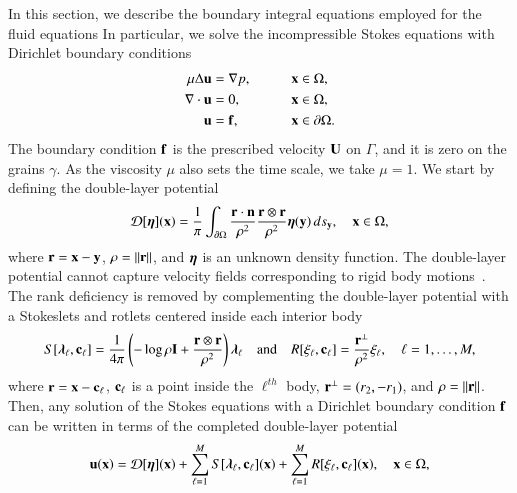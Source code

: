 \documentclass[preprint, 10pt]{elsarticle}
\begin{document}
In this section, we describe the boundary integral equations employed for the fluid
equations \cite{Moore2007}
In particular, we solve the incompressible Stokes equations
with Dirichlet boundary conditions 
\begin{alignat*}{3}
  \mu\Delta {\mathbf{u}} &= {\nabla} p, \qquad && {\mathbf{x}} \in \Omega, \\
  {\nabla} \cdot {\mathbf{u}} &= 0,   && {\mathbf{x}} \in \Omega, \\
  {\mathbf{u}} &= {\mathbf{f}},  && {\mathbf{x}} \in {\partial}\Omega.
\end{alignat*}
The boundary condition ${\mathbf{f}}$ is the prescribed velocity ${\mathbf{U}}$ on
$\Gamma$, and it is zero on the grains $\gamma$.  As the viscosity $\mu$
also sets the time scale, we take $\mu=1$.  We start by defining the
double-layer potential
\begin{align}
  {\mathcal{D}}[{\boldsymbol\eta}]({\mathbf{x}}) = \frac{1}{\pi} \int_{{\partial}\Omega} 
    \frac{{\mathbf{r}} \cdot {\mathbf{n}}}{\rho^2} \frac{{\mathbf{r}} \otimes {\mathbf{r}}}{\rho^2} 
    {\boldsymbol\eta}({\mathbf{y}}) \, ds_{\mathbf{y}}, \quad {\mathbf{x}} \in \Omega,
    \label{eqn:velocityDLP}
\end{align}
where ${\mathbf{r}} = {\mathbf{x}} - {\mathbf{y}}$, $\rho = \|{\mathbf{r}}\|$, and ${\boldsymbol\eta}$ is an unknown density function.  The
double-layer potential cannot capture velocity fields corresponding to
rigid body motions~\cite{pow-mir1987}.  The rank deficiency is removed
by complementing the double-layer potential with a Stokeslets and
rotlets centered inside each interior body
\begin{align}
  S[{\boldsymbol\lambda}_\ell,{\mathbf{c}}_\ell] = \frac{1}{4\pi} \left(-\log \rho {\mathbf{I}} + 
    \frac{{\mathbf{r}} \otimes {\mathbf{r}}}{\rho^2} \right){\boldsymbol\lambda}_\ell
  \quad \text{and} \quad
  R[\xi_\ell,{\mathbf{c}}_\ell] = \frac{{\mathbf{r}}^\perp}{\rho^2}\xi_\ell, 
  \quad \ell=1,\ldots,M,
  \label{eqn:stokeslet_rotlet}
\end{align}
where  ${\mathbf{r}} = {\mathbf{x}} - {\mathbf{c}}_\ell$, ${\mathbf{c}}_\ell$ is a point inside the
$\ell^{th}$ body, ${\mathbf{r}}^\perp = (r_2,-r_1)$, and $\rho = \|{\mathbf{r}}\|$.  Then,
any solution of the Stokes equations with a Dirichlet boundary condition
${\mathbf{f}}$ can be written in terms of the completed double-layer potential
\begin{align}
  \label{eqn:completed_DLP}
  {\mathbf{u}}({\mathbf{x}}) = {\mathcal{D}}[{\boldsymbol\eta}]({\mathbf{x}}) + 
    \sum_{\ell=1}^{M} S[{\boldsymbol\lambda}_\ell,{\mathbf{c}}_\ell]({\mathbf{x}}) +
    \sum_{\ell=1}^{M} R[\xi_\ell,{\mathbf{c}}_\ell]({\mathbf{x}}), \quad {\mathbf{x}} \in \Omega,
\end{align}
\end{document}
